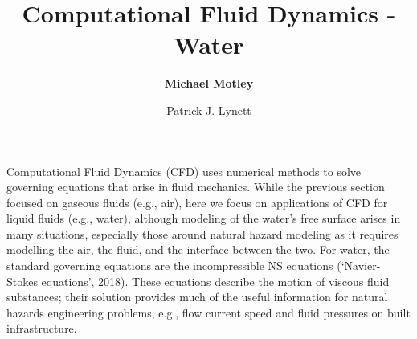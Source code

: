 %
%
%


%
%
%
%
%
%
%
%

\title{Computational Fluid Dynamics - Water}
\author{
    \textbf{Michael Motley}
    \and Patrick J. Lynett}
\tocauthor{}
%
%
\maketitle

Computational Fluid Dynamics (CFD) uses numerical methods to solve governing equations that arise in fluid mechanics. While the previous section focused on gaseous fluids (e.g., air), here we focus on applications of CFD for liquid fluids (e.g., water), although modeling of the water’s free surface arises in many situations, especially those around natural hazard modeling as it requires modelling the air, the fluid, and the interface between the two. For water, the standard governing equations are the incompressible NS equations (‘Navier-Stokes equations’, 2018). These equations describe the motion of viscous fluid substances; their solution provides much of the useful information for natural hazards engineering problems, e.g., flow current speed and fluid pressures on built infrastructure.

